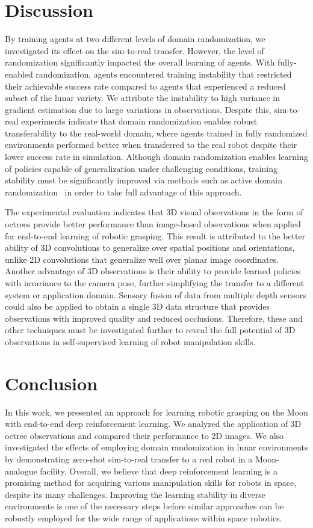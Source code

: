 \section{Discussion}\label{sec:discussion}

By training agents at two different levels of domain randomization, we investigated its effect on the sim-to-real transfer. However, the level of randomization significantly impacted the overall learning of agents. With fully-enabled randomization, agents encountered training instability that restricted their achievable success rate compared to agents that experienced a reduced subset of the lunar variety. We attribute the instability to high variance in gradient estimation due to large variations in observations. Despite this, sim-to-real experiments indicate that domain randomization enables robust transferability to the real-world domain, where agents trained in fully randomized environments performed better when transferred to the real robot despite their lower success rate in simulation. Although domain randomization enables learning of policies capable of generalization under challenging conditions, training stability must be significantly improved via methods such as active domain randomization~\cite{mehta_2019_active} in order to take full advantage of this approach.

The experimental evaluation indicates that 3D visual observations in the form of octrees provide better performance than image-based observations when applied for end-to-end learning of robotic grasping. This result is attributed to the better ability of 3D convolutions to generalize over spatial positions and orientations, unlike 2D convolutions that generalize well over planar image coordinates. Another advantage of 3D observations is their ability to provide learned policies with invariance to the camera pose, further simplifying the transfer to a different system or application domain. Sensory fusion of data from multiple depth sensors could also be applied to obtain a single 3D data structure that provides observations with improved quality and reduced occlusions. Therefore, these and other techniques must be investigated further to reveal the full potential of 3D observations in self-supervised learning of robot manipulation skills.

\section{Conclusion}\label{sec:conclusion}

In this work, we presented an approach for learning robotic grasping on the Moon with end-to-end deep reinforcement learning. We analyzed the application of 3D octree observations and compared their performance to 2D images. We also investigated the effects of employing domain randomization in lunar environments by demonstrating zero-shot sim-to-real transfer to a real robot in a Moon-analogue facility. Overall, we believe that deep reinforcement learning is a promising method for acquiring various manipulation skills for robots in space, despite its many challenges. Improving the learning stability in diverse environments is one of the necessary steps before similar approaches can be robustly employed for the wide range of applications within space robotics.
